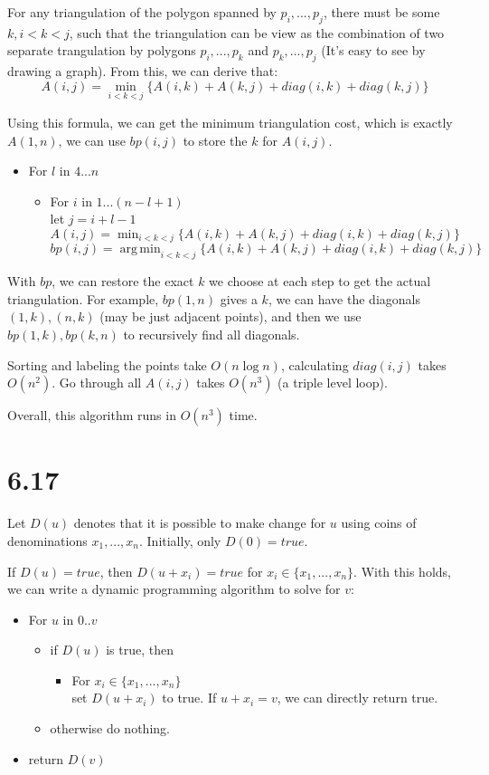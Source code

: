 \documentclass[twoside]{homework}
\DeclareMathOperator*{\argmin}{arg\,min}
\begin{document}
For any triangulation of the polygon spanned by $p_i, ..., p_j$, there must be some $k, i < k < j$, such that the triangulation can be view as the combination of two separate trangulation by polygons $p_i, ..., p_k$ and $p_k, ..., p_j$ (It's easy to see by drawing a graph). From this, we can derive that:
\[ A(i, j) = \min_{i < k < j} \{A(i, k) + A(k, j) + diag(i, k) + diag(k, j)\}\]

Using this formula, we can get the minimum triangulation cost, which is exactly $A(1, n)$, we can use $bp(i, j)$ to store the $k$ for $A(i, j)$.
\begin{itemize}
	\item For $l$ in $4...n$
		\begin{itemize}
			\item For $i$ in $1...(n-l+1)$
			\\
				let $j = i + l - 1$
				\\
				$A(i, j) = \min_{i < k < j} \{A(i, k) + A(k, j) + diag(i, k) + diag(k, j)\}$
				\\
				$bp(i, j) = \argmin_{i < k < j} \{A(i, k) + A(k, j) + diag(i, k) + diag(k, j)\}$
		\end{itemize}
\end{itemize}
With $bp$, we can restore the exact $k$ we choose at each step to get the actual triangulation. For example, $bp(1, n)$ gives a $k$, we can have the diagonals $(1,k), (n, k)$ (may be just adjacent points), and then we use $bp(1, k), bp(k, n)$ to recursively find all diagonals.

Sorting and labeling the points take $O(n\log n)$, calculating $diag(i, j)$ takes $O(n^2)$. Go through all $A(i, j)$ takes $O(n^3)$ (a triple level loop).

Overall, this algorithm runs in $O(n^3)$ time.

\section{6.17}

Let $D(u)$ denotes that it is possible to make change for $u$ using coins of denominations $x_1, ..., x_n$. Initially, only $D(0) = true$.

If $D(u) = true$, then $D(u+x_i) = true$ for $x_i \in \{x_1, ..., x_n\}$. With this holds, we can write a dynamic programming algorithm to solve for $v$:

\begin{itemize}
	\item For $u$ in $0..v$
		\begin{itemize}
			\item if $D(u)$ is true, then
				\begin{itemize}
					\item For $x_i \in \{x_1, ..., x_n\}$
							\\
							set $D(u + x_i)$ to true. If $u + x_i = v$, we can directly return true.
				\end{itemize}
			\item otherwise do nothing.
		\end{itemize}
	\item return $D(v)$
\end{itemize}
\end{document}
